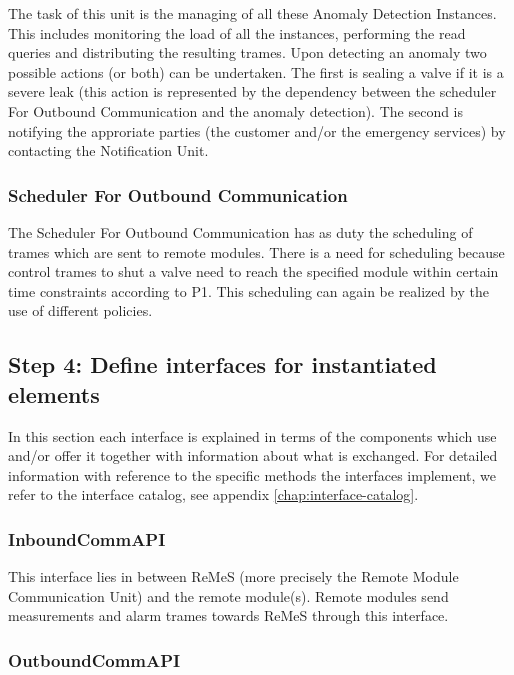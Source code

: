 \npar The task of this unit is the managing of all these Anomaly Detection
Instances. This includes monitoring the load of all the instances, performing
the read queries and distributing the resulting trames. Upon detecting an
anomaly two possible actions (or both) can be undertaken. The first is sealing a
valve if it is a severe leak (this action is represented by the dependency
between the scheduler For Outbound Communication and the anomaly detection). The
second is notifying the approriate parties (the customer and/or the emergency
services) by contacting the Notification Unit.

\subsubsection{Scheduler For Outbound Communication}

\npar The Scheduler For Outbound Communication has as duty the scheduling of
trames which are sent to remote modules. There is a need for scheduling because
control trames to shut a valve need to reach the specified module within certain
time constraints according to P1. This scheduling can again be realized by the
use of different policies.

\subsection{Step 4: Define interfaces for instantiated elements}
\label{add:it1/interfaces}

\npar In this section each interface is explained in terms of the components
which use and/or offer it together with information about what is exchanged. For
detailed information with reference to the specific methods the interfaces
implement, we refer to the interface catalog, see appendix
\ref{chap:interface-catalog}.

\subsubsection{InboundCommAPI}

\npar This interface lies in between ReMeS (more precisely the Remote Module
Communication Unit) and the remote module(s). Remote modules send measurements
and alarm trames towards ReMeS through this interface.

\subsubsection{OutboundCommAPI}

